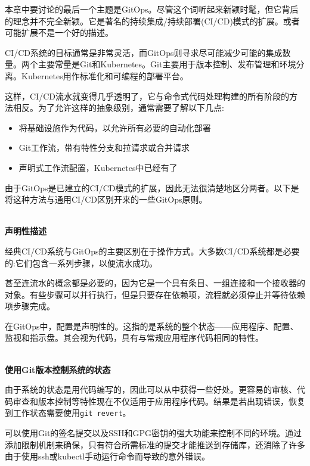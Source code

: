 
本章中要讨论的最后一个主题是GitOps。尽管这个词听起来新颖时髦，但它背后的理念并不完全新颖。它是著名的持续集成/持续部署(CI/CD)模式的扩展。或者可能扩展不是一个好的描述。

CI/CD系统的目标通常是非常灵活，而GitOps则寻求尽可能减少可能的集成数量。两个主要常量是Git和Kubernetes。Git主要用于版本控制、发布管理和环境分离。Kubernetes用作标准化和可编程的部署平台。

这样，CI/CD流水就变得几乎透明了，它与命令式代码处理构建的所有阶段的方法相反。为了允许这样的抽象级别，通常需要了解以下几点:

\begin{itemize}
\item 
将基础设施作为代码，以允许所有必要的自动化部署

\item 
Git工作流，带有特性分支和拉请求或合并请求

\item 
声明式工作流配置，Kubernetes中已经有了
\end{itemize}


由于GitOps是已建立的CI/CD模式的扩展，因此无法很清楚地区分两者。以下是将这种方法与通用CI/CD区别开来的一些GitOps原则。

\hspace*{\fill} \\ %
\noindent
\textbf{声明性描述}

经典CI/CD系统与GitOps的主要区别在于操作方式。大多数CI/CD系统都是必要的:它们包含一系列步骤，以便流水成功。

甚至连流水的概念都是必要的，因为它是一个具有条目、一组连接和一个接收器的对象。有些步骤可以并行执行，但是只要存在依赖项，流程就必须停止并等待依赖项步骤完成。

在GitOps中，配置是声明性的。这指的是系统的整个状态——应用程序、配置、监视和指示盘。其会视为代码，具有与常规应用程序代码相同的特性。

\hspace*{\fill} \\ %
\noindent
\textbf{使用Git版本控制系统的状态}

由于系统的状态是用代码编写的，因此可以从中获得一些好处。更容易的审核、代码审查和版本控制等特性现在不仅适用于应用程序代码。结果是若出现错误，恢复到工作状态需要使用\texttt{git revert}。

可以使用Git的签名提交以及SSH和GPG密钥的强大功能来控制不同的环境。通过添加限制机制来确保，只有符合所需标准的提交才能推送到存储库，还消除了许多由于使用ssh或kubectl手动运行命令而导致的意外错误。


